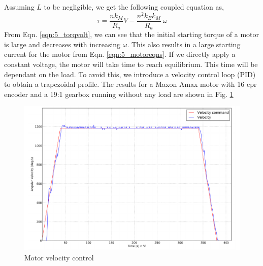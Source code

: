 Assuming $L$ to be negligible, we get the following coupled equation as,
\begin{equation}
\tau = \frac{nk_M}{R_a}V - \frac{n^2k_Ek_M}{R_a}\:\omega
\label{eqn:5_torqvolt}
\end{equation}
From Eqn. \ref{eqn:5_torqvolt}, we can see that the initial starting torque of a motor is large and decreases with increasing $\omega$. This also results in a large starting current for the motor from Eqn. \ref{eqn:5_motoreqns}. If we directly apply a constant voltage, the motor will take time to reach equilibrium. This time will be dependant on the load. To avoid this, we introduce
a velocity control loop (PID) to obtain a trapezoidal profile. The results for a Maxon Amax motor with 16 cpr encoder and a 19:1
gearbox running without any load are shown in Fig. \ref{fig:5_motorpid}
\begin{figure}[!h]
\centering
\includegraphics[scale=1.25]{fig/motor_pid.pdf}
\caption{Motor velocity control}
\label{fig:5_motorpid}
\end{figure}






